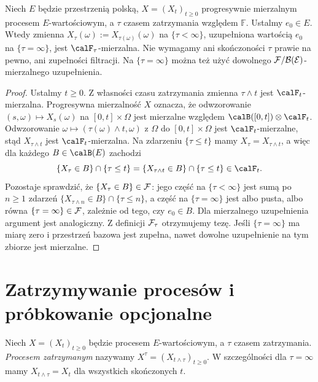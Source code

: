 \begin{twierdzenie}
\label{thm:sampled}
Niech $E$ będzie przestrzenią polską,
$X=(X_t)_{t\ge0}$ progresywnie mierzalnym procesem
$E$-wartościowym, a $\tau$ czasem zatrzymania
względem $\mathbb F$. Ustalmy $e_0\in E$.
Wtedy zmienna $X_\tau(\omega):=X_{\tau(\omega)}(\omega)$
na $\{\tau<\infty\}$, uzupełniona wartością $e_0$
na $\{\tau=\infty\}$, jest $\calF_\tau$-mierzalna.
Nie wymagamy ani skończoności $\tau$ prawie na pewno,
ani zupełności filtracji. Na $\{\tau=\infty\}$ można też
użyć dowolnego $\cal F/\cal B(E)$-mierzalnego uzupełnienia.
\end{twierdzenie}
\begin{proof}
Ustalmy $t\ge0$. Z własności czasu zatrzymania
zmienna $\tau\wedge t$ jest $\calF_t$-mierzalna.
Progresywna mierzalność $X$ oznacza, że odwzorowanie
$(s,\omega)\mapsto X_s(\omega)$ na $[0,t]\times\Omega$
jest mierzalne względem
$\calB([0,t])\otimes\calF_t$.
Odwzorowanie
$\omega\mapsto(\tau(\omega)\wedge t,\omega)$
z $\Omega$ do $[0,t]\times\Omega$ jest
$\calF_t$-mierzalne, stąd
$X_{\tau\wedge t}$ jest $\calF_t$-mierzalna.
Na zdarzeniu $\{\tau\le t\}$ mamy
$X_\tau=X_{\tau\wedge t}$, a więc dla każdego
$B\in\calB(E)$ zachodzi
\[
\{X_\tau\in B\}\cap\{\tau\le t\}
=\{X_{\tau\wedge t}\in B\}\cap\{\tau\le t\}\in\calF_t.
\]
Pozostaje sprawdzić, że $\{X_\tau\in B\}\in\cal F$:
jego część na $\{\tau<\infty\}$ jest sumą po $n\ge1$
zdarzeń $\{X_{\tau\wedge n}\in B\}\cap\{\tau\le n\}$,
a część na $\{\tau=\infty\}$ jest albo pusta, albo
równa $\{\tau=\infty\}\in\cal F$, zależnie od tego,
czy $e_0\in B$. Dla mierzalnego uzupełnienia argument
jest analogiczny. Z definicji $\cal F_\tau$ otrzymujemy tezę.
Jeśli $\{\tau=\infty\}$ ma miarę zero i przestrzeń bazowa
jest zupełna, nawet dowolne uzupełnienie na tym zbiorze
jest mierzalne.
\end{proof}

\section{Zatrzymywanie procesów i próbkowanie opcjonalne}
\begin{definicja}
Niech $X=(X_t)_{t\ge0}$ będzie procesem $E$-wartościowym,
a $\tau$ czasem zatrzymania. \emph{Procesem zatrzymanym}
nazywamy $X^\tau=(X_{t\wedge\tau})_{t\ge0}$.
W szczególności dla $\tau=\infty$ mamy
$X_{t\wedge\tau}=X_t$ dla wszystkich skończonych $t$.
\end{definicja}

